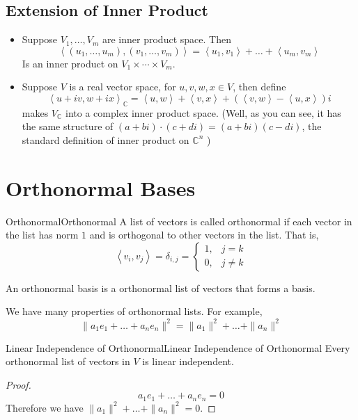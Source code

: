 \documentclass[../main.tex]{subfiles}
\begin{document}
\subsection{Extension of Inner Product}
\begin{itemize}
\item Suppose $V_1, \ldots ,V_m$ are inner product space. Then
\begin{equation*}
\left<(u_1, \ldots ,u_m),(v_1, \ldots ,v_m)\right> = \left<u_1,v_1\right> +\ldots +\left<u_m,v_m\right> 
\end{equation*}
Is an inner product on $V_1 \times \cdots \times V_m$.

\item Suppose $V$ is a real vector space, for $u,v,w,x\in V$, then define
	\begin{equation*}
	\left<u+iv,w+ix\right>_{\mathbb{C}} = \left<u,w\right> + \left<v,x\right> + \left(\left<v,w\right> - \left<u,x\right>\right)i
	\end{equation*}
	makes $V_{\mathbb{C}}$ into a complex inner product space. (Well, as you can see, it has the same structure of $(a+bi) \cdot (c+di) = (a+bi)(c-di)$, the standard definition of inner product on $\mathbb{C}^n$ )
\end{itemize}

\section{Orthonormal Bases}

\begin{definition}{Orthonormal}{Orthonormal}
A list of vectors is called orthonormal if each vector in the list has norm $1$ and is orthogonal to other vectors in the list. That is, 
\begin{equation*}
\left< v_i, v_j\right>  = \delta_{i,j} = 
\begin{cases}
	1, & j=k\\
	0, & j\neq k
\end{cases}
\end{equation*}

An orthonormal basis is a orthonormal list of vectors that forms a basis.
\end{definition}

We have many properties of orthonormal lists. For example,
\begin{equation*}
\|a_1e_1+\ldots +a_ne_n\|^2 = \|a_1\|^2 +\ldots +\|a_n\|^2
\end{equation*}
\begin{proposition}{Linear Independence of Orthonormal}{Linear Independence of Orthonormal}
Every orthonormal list of vectors in $V$ is linear independent.
\end{proposition}
\begin{proof}
\begin{equation*}
a_1e_1+\ldots +a_ne_n = 0
\end{equation*}
Therefore we have $\|a_1\|^2+\ldots +\|a_n\|^2=0$.
\end{proof}
\end{document}
